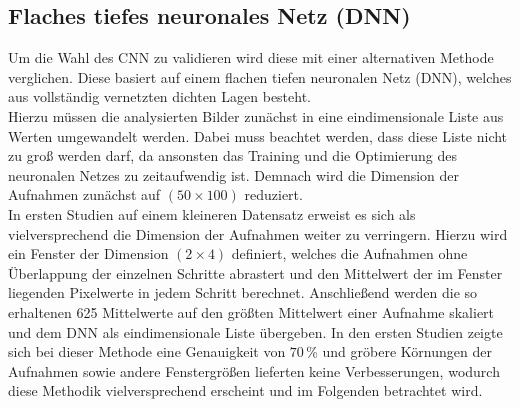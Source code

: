 \subsection{Flaches tiefes neuronales Netz (DNN)}

Um die Wahl des CNN zu validieren wird diese mit einer alternativen Methode verglichen. Diese basiert auf einem flachen tiefen neuronalen Netz (DNN), welches aus vollständig vernetzten dichten Lagen besteht. \\
Hierzu müssen die analysierten Bilder zunächst in eine eindimensionale Liste aus Werten umgewandelt werden. Dabei muss beachtet werden, dass diese Liste nicht zu groß werden darf, da ansonsten das Training und die Optimierung des neuronalen Netzes zu zeitaufwendig ist. Demnach wird die Dimension der Aufnahmen zunächst auf $(50\times 100)$ reduziert.\\
In ersten Studien auf einem kleineren Datensatz erweist es sich als vielversprechend die Dimension der Aufnahmen weiter zu verringern. Hierzu wird ein Fenster der Dimension $(2\times 4)$ definiert, welches die Aufnahmen ohne Überlappung der einzelnen Schritte abrastert und den Mittelwert der im Fenster liegenden Pixelwerte in jedem Schritt berechnet. Anschließend werden die so erhaltenen 625 Mittelwerte auf den größten Mittelwert einer Aufnahme skaliert und dem DNN als eindimensionale Liste übergeben. In den ersten Studien zeigte sich bei dieser Methode eine Genauigkeit von $70\,\%$ und gröbere Körnungen der Aufnahmen sowie andere Fenstergrößen lieferten keine Verbesserungen, wodurch diese Methodik vielversprechend erscheint und im Folgenden betrachtet wird. \\
